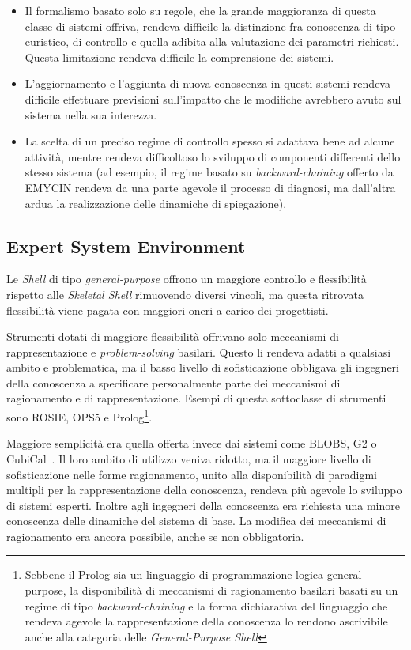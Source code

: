 \begin{itemize}
	\item[(1)] Il formalismo basato solo su regole, che la grande maggioranza di questa classe di sistemi offriva, rendeva difficile la distinzione fra conoscenza di tipo euristico, di controllo e quella adibita alla valutazione dei parametri richiesti. Questa limitazione rendeva difficile la comprensione dei sistemi.
	\item[(2)] L'aggiornamento e l'aggiunta di nuova conoscenza in questi sistemi rendeva difficile effettuare previsioni sull'impatto che le modifiche avrebbero avuto sul sistema nella sua interezza.
	\item[(3)] La scelta di un preciso regime di controllo spesso si adattava bene ad alcune attività, mentre rendeva difficoltoso lo sviluppo di componenti differenti dello stesso sistema (ad esempio, il regime basato su \emph{backward-chaining} offerto da EMYCIN rendeva da una parte agevole il processo di diagnosi, ma dall'altra ardua la realizzazione delle dinamiche di spiegazione).
\end{itemize}

\subsection{Expert System Environment}
Le \emph{Shell} di tipo \emph{general-purpose} offrono un maggiore controllo e flessibilità rispetto alle \emph{Skeletal Shell} rimuovendo diversi vincoli, ma questa ritrovata flessibilità viene pagata con maggiori oneri a carico dei progettisti. 

Strumenti dotati di maggiore flessibilità offrivano solo meccanismi di rappresentazione e \emph{problem-solving} basilari. Questo li rendeva adatti a qualsiasi ambito e problematica, ma il basso livello di sofisticazione obbligava gli ingegneri della conoscenza a specificare personalmente parte dei meccanismi di ragionamento e di rappresentazione. Esempi di questa sottoclasse di strumenti sono ROSIE, OPS5 e Prolog\footnote{Sebbene il Prolog sia un linguaggio di programmazione logica general-purpose, la disponibilità di meccanismi di ragionamento basilari basati su un regime di tipo \emph{backward-chaining} e la forma dichiarativa del linguaggio che rendeva agevole la rappresentazione della conoscenza lo rendono ascrivibile anche alla categoria delle \emph{General-Purpose Shell}}.

Maggiore semplicità era quella offerta invece dai sistemi come BLOBS, G2 o CubiCal~\cite{development1993}. Il loro ambito di utilizzo veniva ridotto, ma il maggiore livello di sofisticazione nelle forme ragionamento, unito alla disponibilità di paradigmi multipli per la rappresentazione della conoscenza, rendeva più agevole lo sviluppo di sistemi esperti. Inoltre agli ingegneri della conoscenza era richiesta una minore conoscenza delle dinamiche del sistema di base. La modifica dei meccanismi di ragionamento era ancora possibile, anche se non obbligatoria.

